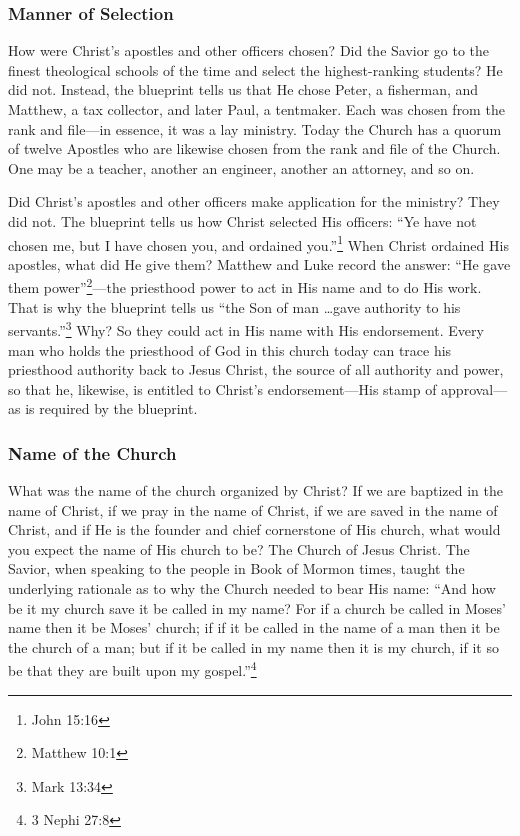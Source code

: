 \documentclass{article}
\begin{document}
\subsubsection*{Manner of Selection}
How were Christ's apostles and other officers chosen? Did the Savior go to the finest theological schools of the time and select the highest-ranking students? He did not. Instead, the blueprint tells us that He chose Peter, a fisherman, and Matthew, a tax collector, and later Paul, a tentmaker. Each was chosen from the rank and file---in essence, it was a lay ministry. Today the Church has a quorum of twelve Apostles who are likewise chosen from the rank and file of the Church. One may be a teacher, another an engineer, another an attorney, and so on.

Did Christ's apostles and other officers make application for the ministry? They did not. The blueprint tells us how Christ selected His officers: ``Ye have not chosen me, but I have chosen you, and ordained you.''\footnote{John 15:16} When Christ ordained His apostles, what did He give them? Matthew and Luke record the answer: ``He gave them power''\footnote{Matthew 10:1}---the priesthood power to act in His name and to do His work. That is why the blueprint tells us ``the Son of man \ldots gave authority to his servants.''\footnote{Mark 13:34} Why? So they could act in His name with His endorsement. Every man who holds the priesthood of God in this church today can trace his priesthood authority back to Jesus Christ, the source of all authority and power, so that he, likewise, is entitled to Christ's endorsement---His stamp of approval---as is required by the blueprint.

\subsubsection*{Name of the Church}
What was the name of the church organized by Christ? If we are baptized in the name of Christ, if we pray in the name of Christ, if we are saved in the name of Christ, and if He is the founder and chief cornerstone of His church, what would you expect the name of His church to be? The Church of Jesus Christ. The Savior, when speaking to the people in Book of Mormon times, taught the underlying rationale as to why the Church needed to bear His name: ``And how be it my church save it be called in my name? For if a church be called in Moses' name then it be Moses' church; if if it be called in the name of a man then it be the church of a man; but if it be called in my name then it is my church, if it so be that they are built upon my gospel.''\footnote{3 Nephi 27:8}
\end{document}
